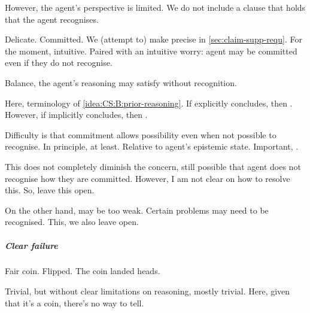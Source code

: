 \begin{note}
  However, the agent's perspective is limited.
  We do not include a clause that holds that the agent recognises.

  Delicate.
  Committed.
  We (attempt to) make precise in \autoref{sec:claim-supp-requ}.
  For the moment, intuitive.
  Paired with an intuitive worry: agent may be committed even if they do not recognise.

  Balance, the agent's reasoning may satisfy without recognition.

  Here,  terminology of \ref{idea:CS:B:prior-reasoning}.
  If explicitly concludes, then .
  However, if implicitly concludes, then .

  Difficulty is that commitment allows possibility even when not possible to recognise.
  In principle, at least.
  Relative to agent's epistemic state.
  Important, \ep{}.

  This does not completely diminish the concern, still possible that agent does not recognise how they are committed.
  However, I am not clear on how to resolve this.
  So, leave this open.

  On the other hand,  may be too weak.
  Certain problems may need to be recognised.
  This, we also leave open.
\end{note}


\paragraph{}

\subparagraph{Clear failure}

\begin{note}
  Fair coin.
  Flipped.
  The coin landed heads.

  Trivial, but without clear limitations on reasoning, mostly trivial.
  Here, given that it's a coin, there's no way to tell.
\end{note}

